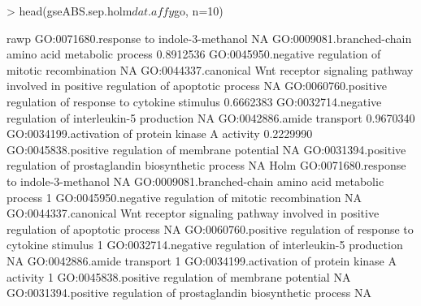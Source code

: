 \documentclass[11pt]{article}
\renewenvironment{Schunk}{\vspace{\topsep}}{\vspace{\topsep}}
\begin{document}
\begin{Schunk}
\begin{Soutput}
\end{Soutput}
\begin{Sinput}
> head(gseABS.sep.holm$dat.affy$go, n=10)
\end{Sinput}
\begin{Soutput}
                                                                                                              rawp
GO:0071680.response to indole-3-methanol                                                                        NA
GO:0009081.branched-chain amino acid metabolic process                                                   0.8912536
GO:0045950.negative regulation of mitotic recombination                                                         NA
GO:0044337.canonical Wnt receptor signaling pathway involved in positive regulation of apoptotic process        NA
GO:0060760.positive regulation of response to cytokine stimulus                                          0.6662383
GO:0032714.negative regulation of interleukin-5 production                                                      NA
GO:0042886.amide transport                                                                               0.9670340
GO:0034199.activation of protein kinase A activity                                                       0.2229990
GO:0045838.positive regulation of membrane potential                                                            NA
GO:0031394.positive regulation of prostaglandin biosynthetic process                                            NA
                                                                                                         Holm
GO:0071680.response to indole-3-methanol                                                                   NA
GO:0009081.branched-chain amino acid metabolic process                                                      1
GO:0045950.negative regulation of mitotic recombination                                                    NA
GO:0044337.canonical Wnt receptor signaling pathway involved in positive regulation of apoptotic process   NA
GO:0060760.positive regulation of response to cytokine stimulus                                             1
GO:0032714.negative regulation of interleukin-5 production                                                 NA
GO:0042886.amide transport                                                                                  1
GO:0034199.activation of protein kinase A activity                                                          1
GO:0045838.positive regulation of membrane potential                                                       NA
GO:0031394.positive regulation of prostaglandin biosynthetic process                                       NA
\end{Soutput}
\end{Schunk}
\end{document}
